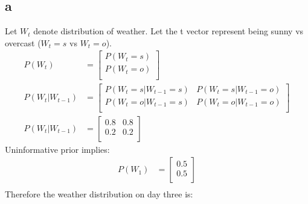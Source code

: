 \documentclass[12pt]{article}
\begin{document}
\subsection{a}
Let $W_t$ denote distribution of weather. Let the t vector represent being sunny vs overcast ($W_t=s$ vs $W_t=o$).
\begin{align*}
    P(W_t)         & = \begin{bmatrix}
        P(W_t = s) \\
        P(W_t = o) \\
    \end{bmatrix} \\
    P(W_t|W_{t-1}) & = \begin{bmatrix}
        P(W_t = s | W_{t-1} = s) & P(W_t = s | W_{t-1} = o) \\
        P(W_t = o | W_{t-1} = s) & P(W_t = o | W_{t-1} = o) \\
    \end{bmatrix} \\
    P(W_t|W_{t-1}) & = \begin{bmatrix}
        0.8 & 0.8 \\
        0.2 & 0.2 \\
    \end{bmatrix}
\end{align*}
Uninformative prior implies:
\begin{align*}
    P(W_1) & = \begin{bmatrix}
        0.5 \\
        0.5 \\
    \end{bmatrix} \\
\end{align*}
Therefore the weather distribution on day three is:
\end{document}
